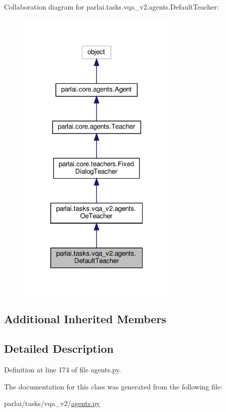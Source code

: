 Collaboration diagram for parlai.\+tasks.\+vqa\+\_\+v2.\+agents.\+Default\+Teacher\+:
\nopagebreak
\begin{figure}[H]
\begin{center}
\leavevmode
\includegraphics[width=217pt]{classparlai_1_1tasks_1_1vqa__v2_1_1agents_1_1DefaultTeacher__coll__graph}
\end{center}
\end{figure}
\subsection*{Additional Inherited Members}


\subsection{Detailed Description}


Definition at line 174 of file agents.\+py.



The documentation for this class was generated from the following file\+:\begin{DoxyCompactItemize}
\item 
parlai/tasks/vqa\+\_\+v2/\hyperlink{parlai_2tasks_2vqa__v2_2agents_8py}{agents.\+py}\end{DoxyCompactItemize}
